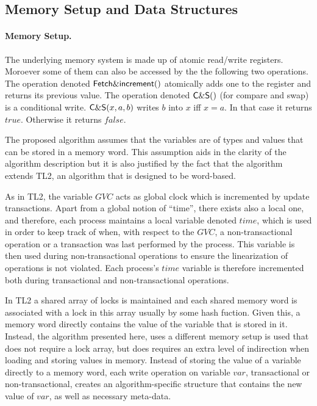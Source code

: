\documentclass[runningheads,a4paper]{llncs}
\begin{document}
\subsection{Memory Setup and Data Structures}


\paragraph{Memory Setup.}
The underlying memory system is made up of atomic read/write registers. 
Moroever some of them can also be accessed by the the following two 
operations. The operation denoted 
${\sf Fetch\&increment}()$ atomically adds one to the register and 
returns its previous value. 
 The operation denoted 
${\sf C\&S}()$ (for compare and swap) is a conditional write. 
${\sf C\&S}(x,a,b)$ writes $b$ into $x$ iff $x=a$. In that case it 
returns $\mathit{true}$. Otherwise it returns  $\mathit{false}$. 


The proposed algorithm assumes that the
variables  are  of  types and  values  that  can  be   stored in  a  memory
word. This assumption aids in the clarity of the algorithm description  
but it  is also  justified by the  fact that  the algorithm extends  TL2, an
algorithm that is   designed to be word-based. 

As in TL2,  the variable $\mathit{GVC}$
acts as  global  clock  which  is incremented  by update transactions.
 Apart from a global   notion of ``time'', there exists also
a local one, and therefore, each process maintains a local  
variable denoted $\mathit{time}$,  which is used in order to keep  
track of when, with
respect to the $\mathit{GVC}$, a non-transactional operation 
or a transaction was last performed by
the  process.
This variable is then used during non-transactional operations to ensure
the linearization of operations is not violated.
Each  process's  $\mathit{time}$   variable is   
therefore incremented
both during transactional and non-transactional operations.

In TL2 a  shared array of locks is maintained and each
shared memory word  
is associated with a lock in this array usually by some hash fuction. Given this, a memory
word directly contains  
the value of the variable that  is stored in it.
Instead, the algorithm presented here, uses
a  different memory setup is used that does not require a lock array, but does requires
an extra level of indirection when loading and storing values in memory.
Instead of storing the value of a variable directly to a memory word,
each  write  operation  on  variable  $\mathit{var}$,   transactional  or
non-transactional, creates an algorithm-specific   
structure that contains the new value of  $\mathit{var}$, as
well as necessary meta-data.
\end{document}
